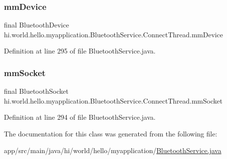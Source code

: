 \subsubsection{\texorpdfstring{mmDevice}{mmDevice}}
{\footnotesize\ttfamily final Bluetooth\+Device hi.\+world.\+hello.\+myapplication.\+Bluetooth\+Service.\+Connect\+Thread.\+mm\+Device\hspace{0.3cm}{\ttfamily [private]}}



Definition at line 295 of file Bluetooth\+Service.\+java.

\mbox{\label{classhi_1_1world_1_1hello_1_1myapplication_1_1_bluetooth_service_1_1_connect_thread_a7f0361ed7d37696342b8c6f28caf325a}} 
\subsubsection{\texorpdfstring{mmSocket}{mmSocket}}
{\footnotesize\ttfamily final Bluetooth\+Socket hi.\+world.\+hello.\+myapplication.\+Bluetooth\+Service.\+Connect\+Thread.\+mm\+Socket\hspace{0.3cm}{\ttfamily [private]}}



Definition at line 294 of file Bluetooth\+Service.\+java.



The documentation for this class was generated from the following file\+:\begin{DoxyCompactItemize}
\item 
app/src/main/java/hi/world/hello/myapplication/\mbox{\hyperlink{_bluetooth_service_8java}{Bluetooth\+Service.\+java}}\end{DoxyCompactItemize}
